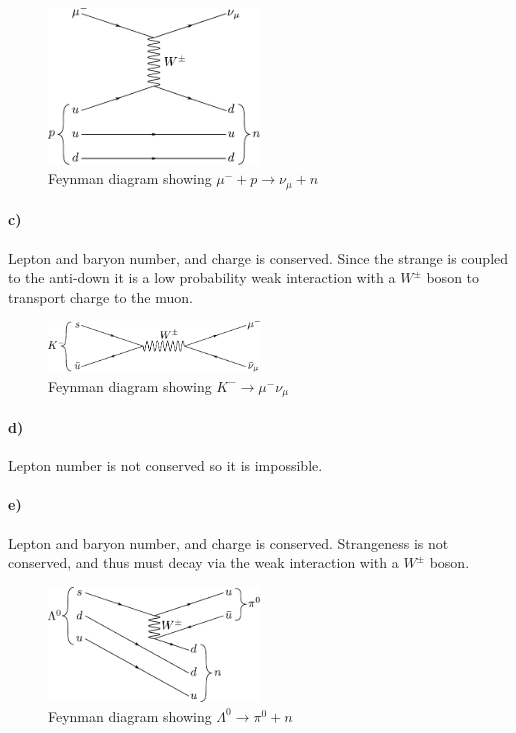 \begin{figure}[H]
	\centering
	\includegraphics[width=0.5\textwidth]{figures/classify_b.pdf}
	\caption{Feynman diagram showing $\mu^- + p \to \nu_\mu + n$}
\end{figure}

\paragraph{c)} Lepton and baryon number, and charge is conserved. Since the strange is coupled to the anti-down it is a low probability weak interaction with a $W^\pm$ boson to transport charge to the muon.

\begin{figure}[H]
	\centering
	\includegraphics[width=0.5\textwidth]{figures/classify_c.pdf}
	\caption{Feynman diagram showing $K^- \to \mu^- \nu_\mu $}
\end{figure}

\paragraph{d)} Lepton number is not conserved so it is impossible.

\paragraph{e)} Lepton and baryon number, and charge is conserved. Strangeness is not conserved, and thus must decay via the weak interaction with a $W^\pm$ boson.

\begin{figure}[H]
	\centering
	\includegraphics[width=0.5\textwidth]{figures/classify_e.pdf}
	\caption{Feynman diagram showing $\Lambda^0 \to \pi^0 + n $}
\end{figure}

